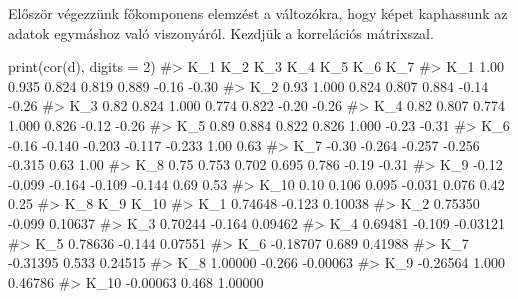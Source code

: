 \documentclass[
  letterpaper,
]{krantz}
\makeatletter
\newenvironment{Shaded}{\begin{snugshade}}{\end{snugshade}}
\newcommand{\AttributeTok}[1]{\textcolor[rgb]{0.40,0.45,0.13}{#1}}
\newcommand{\CommentTok}[1]{\textcolor[rgb]{0.37,0.37,0.37}{#1}}
\newcommand{\DecValTok}[1]{\textcolor[rgb]{0.68,0.00,0.00}{#1}}
\newcommand{\FunctionTok}[1]{\textcolor[rgb]{0.28,0.35,0.67}{#1}}
\newcommand{\NormalTok}[1]{\textcolor[rgb]{0.00,0.23,0.31}{#1}}
\newenvironment{kframe}{%
\medskip{}
\setlength{\fboxsep}{.8em}
 \def\at@end@of@kframe{}%
 \ifinner\ifhmode%
  \def\at@end@of@kframe{\end{minipage}}%
  \begin{minipage}{\columnwidth}%
 \fi\fi%
 \def\FrameCommand##1{\hskip\@totalleftmargin \hskip-\fboxsep
 \colorbox{shadecolor}{##1}\hskip-\fboxsep
     \hskip-\linewidth \hskip-\@totalleftmargin \hskip\columnwidth}%
 \MakeFramed {\advance\hsize-\width
   \@totalleftmargin\z@ \linewidth\hsize
   \@setminipage}}%
 {\par\unskip\endMakeFramed%
 \at@end@of@kframe}
\renewenvironment{Shaded}{\begin{kframe}}{\end{kframe}}
\makeatother
\begin{document}
Először végezzünk főkomponens elemzést a változókra, hogy képet
kaphassunk az adatok egymáshoz való viszonyáról. Kezdjük a korrelációs
mátrixszal.

\begin{Shaded}
\begin{Highlighting}[]
\FunctionTok{print}\NormalTok{(}\FunctionTok{cor}\NormalTok{(d), }\AttributeTok{digits =} \DecValTok{2}\NormalTok{)}
\CommentTok{\#\textgreater{}        K\_1    K\_2    K\_3    K\_4    K\_5   K\_6   K\_7}
\CommentTok{\#\textgreater{} K\_1   1.00  0.935  0.824  0.819  0.889 {-}0.16 {-}0.30}
\CommentTok{\#\textgreater{} K\_2   0.93  1.000  0.824  0.807  0.884 {-}0.14 {-}0.26}
\CommentTok{\#\textgreater{} K\_3   0.82  0.824  1.000  0.774  0.822 {-}0.20 {-}0.26}
\CommentTok{\#\textgreater{} K\_4   0.82  0.807  0.774  1.000  0.826 {-}0.12 {-}0.26}
\CommentTok{\#\textgreater{} K\_5   0.89  0.884  0.822  0.826  1.000 {-}0.23 {-}0.31}
\CommentTok{\#\textgreater{} K\_6  {-}0.16 {-}0.140 {-}0.203 {-}0.117 {-}0.233  1.00  0.63}
\CommentTok{\#\textgreater{} K\_7  {-}0.30 {-}0.264 {-}0.257 {-}0.256 {-}0.315  0.63  1.00}
\CommentTok{\#\textgreater{} K\_8   0.75  0.753  0.702  0.695  0.786 {-}0.19 {-}0.31}
\CommentTok{\#\textgreater{} K\_9  {-}0.12 {-}0.099 {-}0.164 {-}0.109 {-}0.144  0.69  0.53}
\CommentTok{\#\textgreater{} K\_10  0.10  0.106  0.095 {-}0.031  0.076  0.42  0.25}
\CommentTok{\#\textgreater{}           K\_8    K\_9     K\_10}
\CommentTok{\#\textgreater{} K\_1   0.74648 {-}0.123  0.10038}
\CommentTok{\#\textgreater{} K\_2   0.75350 {-}0.099  0.10637}
\CommentTok{\#\textgreater{} K\_3   0.70244 {-}0.164  0.09462}
\CommentTok{\#\textgreater{} K\_4   0.69481 {-}0.109 {-}0.03121}
\CommentTok{\#\textgreater{} K\_5   0.78636 {-}0.144  0.07551}
\CommentTok{\#\textgreater{} K\_6  {-}0.18707  0.689  0.41988}
\CommentTok{\#\textgreater{} K\_7  {-}0.31395  0.533  0.24515}
\CommentTok{\#\textgreater{} K\_8   1.00000 {-}0.266 {-}0.00063}
\CommentTok{\#\textgreater{} K\_9  {-}0.26564  1.000  0.46786}
\CommentTok{\#\textgreater{} K\_10 {-}0.00063  0.468  1.00000}
\end{Highlighting}
\end{Shaded}
\end{document}
